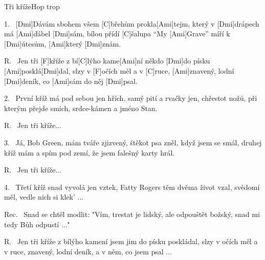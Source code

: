 \begin{song}{Tři kříže}{Hop trop}

\begin{xverse}{1.~}
[\large Dmi]Dávám sbohem všem [\large C]břehům prokla[\large Ami]tejm,
který v [\large Dmi]drápech má [\large Ami]{}ďábel [\large Dmi]sám,
bílou přídí [\large C]{}šalupa ``My [\large Ami]Grave''
míří k [\large Dmi]{}útesům, [\large Ami]který [\large Dmi]znám.
\end{xverse}


\begin{xverse}{R.~}
Jen tři [\large F]kříže z bí[\large C]lýho kame[\large Ami]ní
někdo [\large Dmi]do písku [\large Ami]posklá[\large Dmi]dal,
slzy v [\large F]očích měl a v [\large C]ruce, [\large Ami]znavený,
lodní [\large Dmi]deník, co [\large Ami]sám do něj [\large Dmi]psal.
\end{xverse}


\begin{xverse}{2.~}
První kříž má pod sebou jen hřích,
samý pití a rvačky jen,
chřestot nožů, při kterým přejde smích,
srdce-kámen a jméno Stan.
\end{xverse}


\begin{xverse}{R.~}
Jen tři kříže...
\end{xverse}


\begin{xverse}{3.~}
Já, Bob Green, mám tváře zjizvený,
štěkot psa zněl, když jsem se smál,
druhej kříž mám a spím pod zemí,
že jsem falešný karty hrál.
\end{xverse}


\begin{xverse}{R.~}
Jen tři kříže...
\end{xverse}


\begin{xverse}{4.~}
Třetí kříž snad vyvolá jen vztek,
Fatty Rogers těm dvěma život vzal,
svědomí měl, vedle nich si klek' ...
\end{xverse}

\begin{xverse}{Rec.~}
Snad se chtěl modlit:
"Vím, trestat je lidský,
ale odpouštět božský,
snad mi tedy Bůh odpustí ..."
\end{xverse}

\begin{xverse}{R.~}
Jen tři kříže z bílýho kamení
jsem jim do písku poskládal,
slzy v očích měl a v ruce, znavený,
lodní deník, a v něm, co jsem psal ...
\end{xverse}

\end{song}

